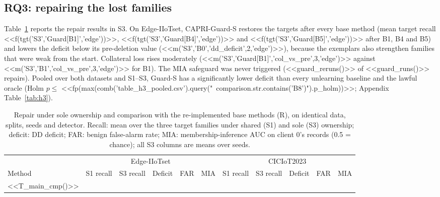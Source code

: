 \documentclass[pdflatex,sn-mathphys-num,iicol]{sn-jnl}
\begin{document}
\subsection{RQ3: repairing the lost families}\label{sec:res-rq3}

Table~\ref{tab:basecmp} reports the repair results in S3. On Edge-IIoTset, CAPRI-Guard-S restores the targets after every base method (mean target recall <<f(tgt('S3','Guard[B1]','edge'))>>, <<f(tgt('S3','Guard[B4]','edge'))>> and <<f(tgt('S3','Guard[B5]','edge'))>> after B1, B4 and B5) and lowers the deficit below its pre-deletion value (<<m('S3','B0','dd_deficit',2,'edge')>>), because the exemplars also strengthen families that were weak from the start. Collateral loss rises moderately (<<m('S3','Guard[B1]','col_vs_pre',3,'edge')>> against <<m('S3','B1','col_vs_pre',3,'edge')>> for B1). The MIA safeguard was never triggered (<<guard_reruns()>> of <<guard_runs()>> repairs). Pooled over both datasets and S1--S3, Guard-S has a significantly lower deficit than every unlearning baseline and the lawful oracle (Holm $p\le$ <<fp(max(comb('table_h3_pooled.csv').query("~comparison.str.contains('B8')").p_holm))>>; Appendix Table~\ref{tab:h3}).



\begin{table}[t]
\caption{Repair under sole ownership and comparison with the re-implemented base methods (R), on identical data, splits, seeds and detector. Recall: mean over the three target families under shared (S1) and sole (S3) ownership; deficit: DD deficit; FAR: benign false-alarm rate; MIA: membership-inference AUC on client 0's records (0.5 = chance); all S3 columns are means over seeds.}\label{tab:basecmp}
\scriptsize
\setlength{\tabcolsep}{1.5pt}
\begin{tabular*}{\textwidth}{@{\extracolsep\fill}lcccccccccc@{}}
\toprule
 & \multicolumn{5}{c}{Edge-IIoTset} & \multicolumn{5}{c}{CICIoT2023} \\
\cmidrule(lr){2-6}\cmidrule(lr){7-11}
Method & S1 recall & S3 recall & Deficit & FAR & MIA & S1 recall & S3 recall & Deficit & FAR & MIA \\
\midrule
<<T_main_cmp()>>
\botrule
\end{tabular*}
\end{table}
\end{document}
